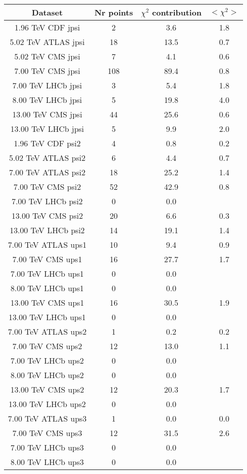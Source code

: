 \begin{table}[h!]
\centering
\begin{tabular}{c|c|c|c}
Dataset & Nr points & $\chi^2$ contribution & $<\chi^2>$ \\
\hline
1.96 TeV CDF jpsi & 2 & 3.6 & 1.8 \\
5.02 TeV ATLAS jpsi & 18 & 13.5 & 0.7 \\
5.02 TeV CMS jpsi & 7 & 4.1 & 0.6 \\
7.00 TeV CMS jpsi & 108 & 89.4 & 0.8 \\
7.00 TeV LHCb jpsi & 3 & 5.4 & 1.8 \\
8.00 TeV LHCb jpsi & 5 & 19.8 & 4.0 \\
13.00 TeV CMS jpsi & 44 & 25.6 & 0.6 \\
13.00 TeV LHCb jpsi & 5 & 9.9 & 2.0 \\
1.96 TeV CDF psi2 & 4 & 0.8 & 0.2 \\
5.02 TeV ATLAS psi2 & 6 & 4.4 & 0.7 \\
7.00 TeV ATLAS psi2 & 18 & 25.2 & 1.4 \\
7.00 TeV CMS psi2 & 52 & 42.9 & 0.8 \\
7.00 TeV LHCb psi2 & 0 & 0.0 &  \\
13.00 TeV CMS psi2 & 20 & 6.6 & 0.3 \\
13.00 TeV LHCb psi2 & 14 & 19.1 & 1.4 \\
7.00 TeV ATLAS ups1 & 10 & 9.4 & 0.9 \\
7.00 TeV CMS ups1 & 16 & 27.7 & 1.7 \\
7.00 TeV LHCb ups1 & 0 & 0.0 &  \\
8.00 TeV LHCb ups1 & 0 & 0.0 &  \\
13.00 TeV CMS ups1 & 16 & 30.5 & 1.9 \\
13.00 TeV LHCb ups1 & 0 & 0.0 &  \\
7.00 TeV ATLAS ups2 & 1 & 0.2 & 0.2 \\
7.00 TeV CMS ups2 & 12 & 13.0 & 1.1 \\
7.00 TeV LHCb ups2 & 0 & 0.0 &  \\
8.00 TeV LHCb ups2 & 0 & 0.0 &  \\
13.00 TeV CMS ups2 & 12 & 20.3 & 1.7 \\
13.00 TeV LHCb ups2 & 0 & 0.0 &  \\
7.00 TeV ATLAS ups3 & 1 & 0.0 & 0.0 \\
7.00 TeV CMS ups3 & 12 & 31.5 & 2.6 \\
7.00 TeV LHCb ups3 & 0 & 0.0 &  \\
8.00 TeV LHCb ups3 & 0 & 0.0 &  \\

\end{tabular}
\end{table}
